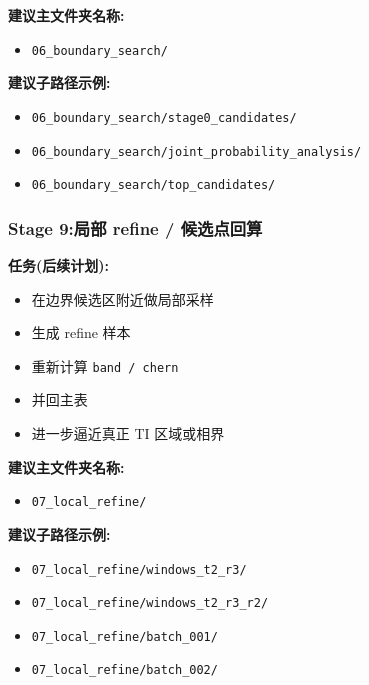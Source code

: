 \documentclass[lang=cn,scheme=chinese,color=blue,device=normal,toc=onecol,math=cm]{elegantbook}
\begin{document}
\textbf{建议主文件夹名称:}\par


\begin{itemize}
\item \texttt{06\_\allowbreak{}boundary\_\allowbreak{}search/\allowbreak{}}
\end{itemize}


\textbf{建议子路径示例:}\par


\begin{itemize}
\item \texttt{06\_\allowbreak{}boundary\_\allowbreak{}search/\allowbreak{}stage0\_\allowbreak{}candidates/\allowbreak{}}
\item \texttt{06\_\allowbreak{}boundary\_\allowbreak{}search/\allowbreak{}joint\_\allowbreak{}probability\_\allowbreak{}analysis/\allowbreak{}}
\item \texttt{06\_\allowbreak{}boundary\_\allowbreak{}search/\allowbreak{}top\_\allowbreak{}candidates/\allowbreak{}}
\end{itemize}


\subsubsection{Stage 9:局部 refine /\allowbreak{} 候选点回算}


\textbf{任务(后续计划):}\par


\begin{itemize}
\item 在边界候选区附近做局部采样
\item 生成 refine 样本
\item 重新计算 \texttt{band /\allowbreak{} chern}
\item 并回主表
\item 进一步逼近真正 TI 区域或相界
\end{itemize}


\textbf{建议主文件夹名称:}\par


\begin{itemize}
\item \texttt{07\_\allowbreak{}local\_\allowbreak{}refine/\allowbreak{}}
\end{itemize}


\textbf{建议子路径示例:}\par


\begin{itemize}
\item \texttt{07\_\allowbreak{}local\_\allowbreak{}refine/\allowbreak{}windows\_\allowbreak{}t2\_\allowbreak{}r3/\allowbreak{}}
\item \texttt{07\_\allowbreak{}local\_\allowbreak{}refine/\allowbreak{}windows\_\allowbreak{}t2\_\allowbreak{}r3\_\allowbreak{}r2/\allowbreak{}}
\item \texttt{07\_\allowbreak{}local\_\allowbreak{}refine/\allowbreak{}batch\_\allowbreak{}001/\allowbreak{}}
\item \texttt{07\_\allowbreak{}local\_\allowbreak{}refine/\allowbreak{}batch\_\allowbreak{}002/\allowbreak{}}
\end{itemize}
\end{document}
